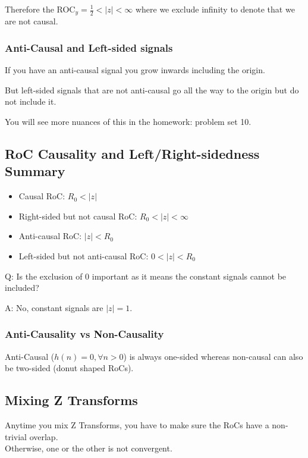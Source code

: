 Therefore the ROC$_y = \frac12<|z|<\infty$ where we exclude infinity to denote that we are not causal.

\subsubsection{Anti-Causal and Left-sided signals}
If you have an anti-causal signal you grow inwards including the origin.

But left-sided signals that are not anti-causal go all the way to the origin but do not include it.

You will see more nuances of this in the homework: problem set 10.

\subsection{ RoC Causality and Left/Right-sidedness Summary}
\begin{itemize}
    \item Causal RoC: $R_0<|z|$
    \item Right-sided but not causal RoC: $R_0<|z|<\infty$
    \item Anti-causal RoC: $|z|<R_0$
    \item Left-sided but not anti-causal RoC: $0<|z|<R_0$
\end{itemize}
\begin{shaded}
Q: Is the exclusion of 0 important as it means the constant signals cannot be included?
\end{shaded}
A: No, constant signals are $|z|=1$.

\subsubsection{Anti-Causality vs Non-Causality}
Anti-Causal ($h(n)=0,\forall n>0$) is always one-sided 
whereas non-causal can also be two-sided (donut shaped RoCs).

\subsection{ Mixing Z Transforms}
Anytime you mix Z Transforms, you have to make sure the RoCs have a non-trivial overlap.\\
Otherwise, one or the other is not convergent.

